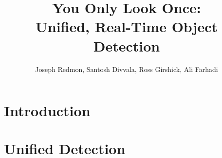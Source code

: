 \documentclass{ctexart}
\title{You Only Look Once:\\Unified, Real-Time Object Detection}
\author{Joseph Redmon, Santosh Divvala, Ross Girshick, Ali Farhadi}
\date{}
\begin{document}
\maketitle
\begin{abstract}
    
\end{abstract}
\section{Introduction}

\section{Unified Detection}

\printbibliography
\end{document}
